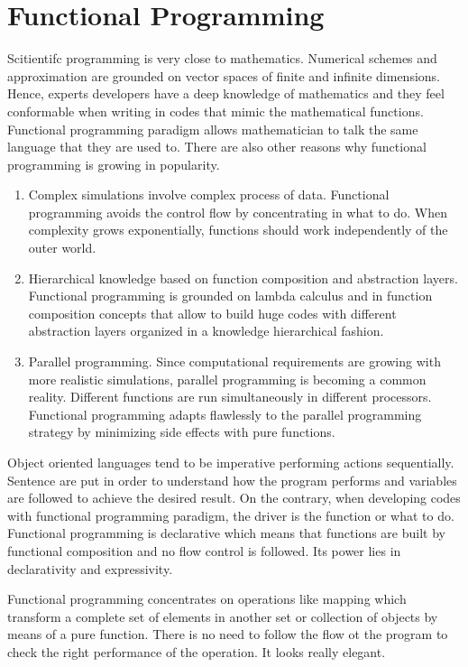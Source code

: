     \section{Functional Programming}
Scitientifc programming is very close 
to mathematics. Numerical schemes and approximation are grounded on vector spaces of finite and 
infinite dimensions. Hence, experts developers have a deep knowledge of mathematics and they 
feel conformable when writing in codes that mimic the mathematical functions. 
Functional programming paradigm allows mathematician to talk the same language that they are used to. 
There are also other reasons why functional programming is growing in popularity. 
\begin{enumerate}
\item Complex simulations involve complex process of data. Functional programming avoids 
the control flow by concentrating in what to do. When complexity grows exponentially, 
functions should work independently of the outer world. 
\item Hierarchical knowledge based on function composition and abstraction layers. 
Functional programming is grounded on lambda calculus and in function composition concepts that 
allow to build huge codes with different abstraction layers organized in a knowledge hierarchical fashion. 
\item Parallel programming. 
Since computational requirements are growing with more realistic simulations, parallel programming is
becoming a common reality. Different functions are run simultaneously in different processors. 
 Functional programming adapts flawlessly to the parallel programming 
strategy by minimizing side effects with pure functions. 
\end{enumerate}
Object oriented languages tend to be imperative performing actions sequentially.  
Sentence are  put in order to understand how the program performs and variables are followed
to achieve the desired result. On the contrary, when developing codes with functional 
programming paradigm, the driver is the function or what to do. 
Functional programming is  declarative which means that functions are built by functional composition
and no flow control is followed. Its power lies in declarativity and expressivity.

Functional programming concentrates on operations like mapping which transform a complete set 
of elements in another set or collection of objects by means of a pure function.  
There is no need to follow the flow ot the program to check the right performance of the operation. 
It looks really elegant.

